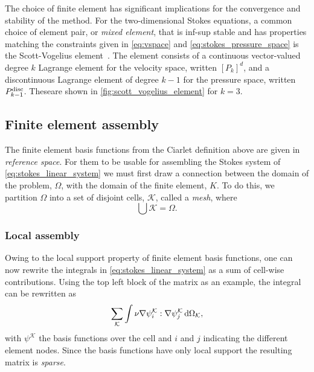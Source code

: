 \documentclass[thesis]{subfiles}
\begin{document}
The choice of finite element has significant implications for the convergence and stability of the method.
For the two-dimensional Stokes equations, a common choice of element pair, or \emph{mixed element}, that is inf-sup stable and has properties matching the constraints given in \cref{eq:vspace} and \cref{eq:stokes_pressure_space} is the Scott-Vogelius element~\cite{scottNormEstimatesMaximal1985}.
The element consists of a continuous vector-valued degree $k$ Lagrange element for the velocity space, written $[P_k]^d$, and a discontinuous Lagrange element of degree $k-1$ for the pressure space, written $P_{k-1}^{\textnormal{disc}}$.
These\footnotemark are shown in \cref{fig:scott_vogelius_element} for $k = 3$.


\subsection{Finite element assembly}

The finite element basis functions from the Ciarlet definition above are given in \emph{reference space}.
For them to be usable for assembling the Stokes system of \cref{eq:stokes_linear_system} we must first draw a connection between the domain of the problem, $\Omega$, with the domain of the finite element, $K$.
To do this, we partition $\Omega$ into a set of disjoint cells, $\mathcal{K}$, called a \emph{mesh}, where
\begin{equation}
  \bigcup \mathcal{K} = \Omega.
\end{equation}

\subsubsection{Local assembly}

Owing to the local support property of finite element basis functions, one can now rewrite the integrals in \cref{eq:stokes_linear_system} as a sum of cell-wise contributions.
Using the top left block of the matrix as an example, the integral can be rewritten as
\begin{equation}
  \sum_{\mathcal{K}} \int \nu \nabla \psi_i^{\mathcal{K}} : \nabla \psi_j^{\mathcal{K}} \, \textnormal{d}\Omega_{\mathcal{K}},
\end{equation}
with $\psi^{\mathcal{K}}$ the basis functions over the cell and $i$ and $j$ indicating the different element nodes.
Since the basis functions have only local support the resulting matrix is \emph{sparse}.
\end{document}
